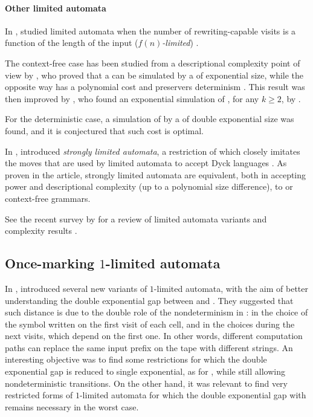 \paragraph{Other limited automata}
In \citeyear{WecBra79}, \citeauthor{WecBra79} studied limited automata when the number of rewriting-capable visits is a function of the length of the input (\emph{$f(n)$-limited}) \cite{WecBra79}.

The context-free case has been studied from a descriptional complexity point of view by \citeauthor{PigPis15}, who proved that a  can be simulated by a \PDA of exponential size, while the opposite way has a polynomial cost and preservers determinism \cite{PigPis15}.
This result was then improved by \citeauthor{KutPig+18}, who found an exponential simulation of \kLA, for any $k\ge2$, by \PDA \cite{KutPig+18}.

For the deterministic case, a simulation of  by a \DPDA of double exponential size was found, and it is conjectured that such cost is optimal.

In \citeyear{Pig16}, \citeauthor{Pig16} introduced \emph{strongly limited automata}, a restriction of  which closely imitates the moves that are used by limited automata to accept Dyck languages \cite{Pig16}.
As proven in the article, strongly limited automata are equivalent, both in accepting power and descriptional complexity (up to a polynomial size difference), to \PDAs or context-free grammars.

See the recent survey by \citeauthor{Pig19} for a review of limited automata variants and complexity results \cite{Pig19}.


\subsection{Once-marking \texorpdfstring{$1$}{1}-limited automata}
In \citeyear{PigPri23a}, \citeauthor{PigPri23a} introduced several new variants of $1$-limited automata, with the aim of better understanding the double exponential gap between \OLA and \ODFA \cite{PigPri23a,PigPri23}.
They suggested that such distance is due to the double role of the nondeterminism in \OLAs: in the choice of the symbol written on the first visit of each cell, and in the choices during the next visits, which depend on the first one.
In other words, different computation paths can replace the same input prefix on the tape with different strings.
An interesting objective was to find some restrictions for which the double exponential gap is reduced to single exponential, as for \ODLA, while still allowing nondeterministic transitions.
On the other hand, it was relevant to find very restricted forms of $1$-limited automata for which the double exponential gap with \ODFA remains necessary in the worst case.


